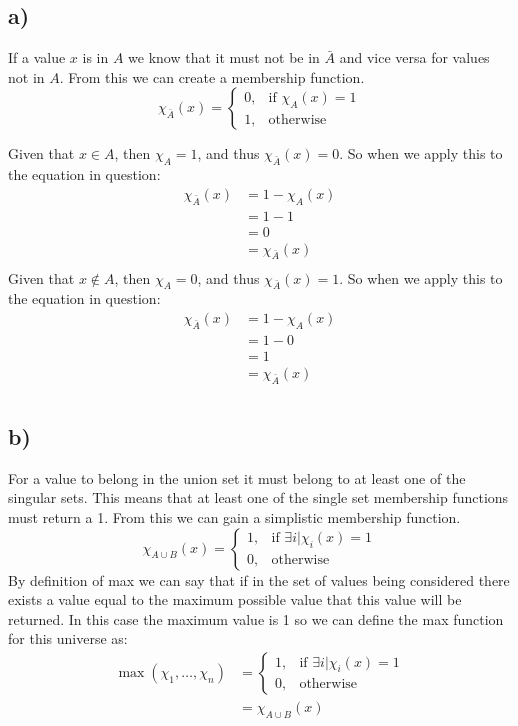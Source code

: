 \documentclass{article}
\begin{document}
\subsection*{a)}

If a value $x$ is in $A$ we know that it must not be in $\bar{A}$ and vice versa for values not in $A$. From this we can create a membership function.
\[
    \chi_{\bar{A}}(x)=
\begin{cases}
    0,& \text{if } \chi_{A}(x)=1\\
    1,& \text{otherwise}
\end{cases}
\]

Given that $x\in A$, then $\chi_A = 1$, and thus $\chi_{\bar{A}}(x) = 0$. So when we apply this to the equation in question:
\begin{align*}
	\chi_{\bar{A}}(x) &= 1-\chi_A(x)\\
					&= 1-1\\
					&= 0\\
					&= \chi_{\bar{A}}(x)\\
\end{align*}
Given that $x\notin A$, then $\chi_A = 0$, and thus $\chi_{\bar{A}}(x) = 1$. So when we apply this to the equation in question:
\begin{align*}
	\chi_{\bar{A}}(x) &= 1-\chi_A(x)\\
					&= 1-0\\
					&= 1\\
					&= \chi_{\bar{A}}(x)\\
\end{align*}


\subsection*{b)}
For a value to belong in the union set it must belong to at least one of the singular sets. This means that at least one of the single set membership functions must return a 1. From this we can gain a simplistic membership function.
\[
	\chi_{A\cup B}(x) =
	\begin{cases}
		1,& \text{if } \exists i | \chi_i(x) = 1 \\
		0,& \text{otherwise}
	\end{cases}
\]
By definition of max we can say that if in the set of values being considered there exists a value equal to the maximum possible value that this value will be returned. In this case the maximum value is 1 so we can define the max function for this universe as:
\begin{align*}
\max(\chi_1, \dots, \chi_n) &=
	\begin{cases}
		1,& \text{if } \exists i | \chi_i(x) = 1 \\
		0,& \text{otherwise}
	\end{cases}\\
	&= \chi_{A\cup B}(x)
\end{align*}
\end{document}
